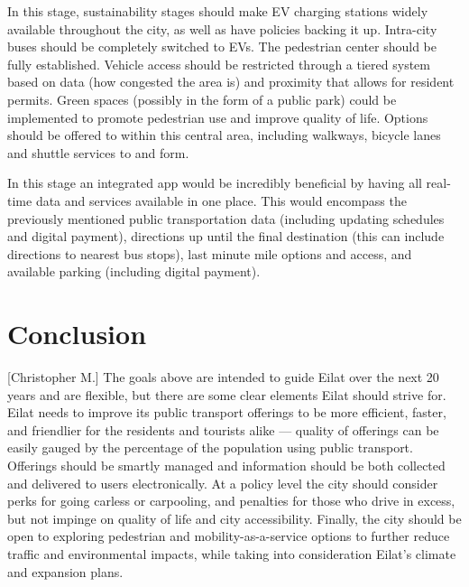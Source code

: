 \documentclass[12pt]{article}                               %
\begin{document}
In this stage, sustainability stages should make EV charging stations widely available throughout the city, as well as have policies backing it up. Intra-city buses should be completely switched to EVs. The pedestrian center should be fully established. Vehicle access should be restricted through a tiered system based on data (how congested the area is) and proximity that allows for resident permits. Green spaces (possibly in the form of a public park) could be implemented to promote pedestrian use and improve quality of life. Options should be offered to within this central area, including walkways, bicycle lanes and shuttle services to and form. 

In this stage an integrated app would be incredibly beneficial by having all real-time data and services available in one place. This would encompass the previously mentioned public transportation data (including updating schedules and digital payment), directions up until the final destination (this can include directions to nearest bus stops), last minute mile options and access, and available parking (including digital payment).



\section{Conclusion}[Christopher M.]\label{sec:conclusion}
The goals above are intended to guide Eilat over the next 20 years and are flexible, but there are some clear elements Eilat should strive for. Eilat needs to improve its public transport offerings to be more efficient, faster, and friendlier for the residents and tourists alike --- quality of offerings can be easily gauged by the percentage of the population using public transport. Offerings should be smartly managed and information should be both collected and delivered to users electronically. At a policy level the city should consider perks for going carless or carpooling, and penalties for those who drive in excess, but not impinge on quality of life and city accessibility. Finally, the city should be open to exploring pedestrian and mobility-as-a-service options to further reduce traffic and environmental impacts, while taking into consideration Eilat's climate and expansion plans.
\end{document}
